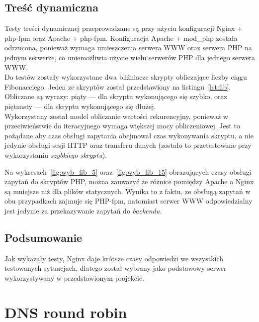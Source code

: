 \subsection{Treść dynamiczna}
Testy treści dynamicznej przeprowadzane są przy użyciu konfiguracji Nginx + php-fpm oraz Apache + php-fpm.
Konfiguracja Apache + mod\_php została odrzucona, ponieważ wymaga umieszczenia serwera WWW oraz serwera PHP na jednym serwerze, co uniemożliwia użycie wielu serwerów PHP dla jednego serwera WWW.\\
Do testów zostały wykorzystane dwa bliźniacze skrypty obliczające liczby ciągu Fibonacciego.
Jeden ze skryptów został przedstawiony na listingu~\ref{lst:fib}.
Obliczane są wyrazy: piąty --- dla skryptu wykonującego się szybko, oraz piętnasty --- dla skryptu wykonującego się dłużej.\\
Wykorzystany został model obliczanie wartości rekurencyjny, ponieważ w przeciwieństwie do iteracyjnego wymaga większej mocy obliczeniowej.
Jest to pożądane aby czas obsługi zapytania obejmował czas wykonywania skryptu, a nie jedynie obsługi sesji HTTP oraz transferu danych (zostało to przetestowane przy wykorzystaniu \textit{szybkiego skryptu}).

Na wykresach~\ref{fig:wyb_fib_5} oraz~\ref{fig:wyb_fib_15} obrazujących czasy obsługi zapytań do skryptów PHP, można zauważyć że różnice pomiędzy Apache a Nginx są mniejsze niż dla plików statycznych.
Wynika to z faktu, ze obsługą zapytań w obu przypadkach zajmuje się PHP-fpm, natomiast serwer WWW odpowiedzialny jest jedynie za przekazywanie zapytań do \textit{backendu}.
\subsection{Podsumowanie}
Jak wykazały testy, Nginx daje krótsze czasy odpowiedzi we wszystkich testowanych sytuacjach, dlatego został wybrany jako podstawowy serwer wykorzystywany w przedstawionym projekcie.
\section{DNS round robin}
